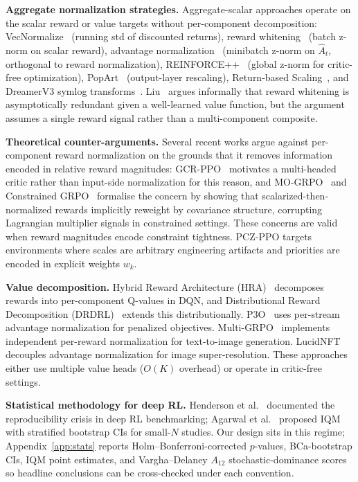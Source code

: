 \documentclass[11pt,a4paper]{article}
\begin{document}
\textbf{Aggregate normalization strategies.} Aggregate-scalar approaches operate on the scalar reward or value targets without per-component decomposition: VecNormalize~\cite{raffin2021sb3} (running std of discounted returns), reward whitening~\cite{liu2023rewardwhitening,huang2024rlhf} (batch z-norm on scalar reward), advantage normalization~\cite{andrychowicz2021whatmatters,huang2022thirtysevendetails} (minibatch z-norm on $\hat{A}_t$, orthogonal to reward normalization), REINFORCE++~\cite{hu2025reinforceplusplus} (global z-norm for critic-free optimization), PopArt~\cite{hessel2019popart,hasselt2016popart} (output-layer rescaling), Return-based Scaling~\cite{schaul2021returnscaling}, and DreamerV3 symlog transforms~\cite{sullivan2023dreamerv3tricks}. Liu~\cite{liu2023rewardwhitening} argues informally that reward whitening is asymptotically redundant given a well-learned value function, but the argument assumes a single reward signal rather than a multi-component composite.

\textbf{Theoretical counter-arguments.}
Several recent works argue against per-component reward normalization on the grounds that it removes information encoded in relative reward magnitudes: GCR-PPO~\cite{gcrppo2025} motivates a multi-headed critic rather than input-side normalization for this reason, and MO-GRPO~\cite{mogrpo2024} and Constrained GRPO~\cite{girgis2026constrainedgrpo} formalise the concern by showing that scalarized-then-normalized rewards implicitly reweight by covariance structure, corrupting Lagrangian multiplier signals in constrained settings. These concerns are valid when reward magnitudes encode constraint tightness. PCZ-PPO targets environments where scales are arbitrary engineering artifacts and priorities are encoded in explicit weights $w_k$.

\textbf{Value decomposition.}
Hybrid Reward Architecture (HRA)~\cite{vanseijen2017hra} decomposes rewards into per-component Q-values in DQN, and Distributional Reward Decomposition (DRDRL)~\cite{lin2019drdrl} extends this distributionally. P3O~\cite{zhang2022p3o} uses per-stream advantage normalization for penalized objectives. Multi-GRPO~\cite{lyu2025multigrpo} implements independent per-reward normalization for text-to-image generation. LucidNFT~\cite{lucidnft2026} decouples advantage normalization for image super-resolution. These approaches either use multiple value heads ($O(K)$ overhead) or operate in critic-free settings.

\textbf{Statistical methodology for deep RL.}
Henderson et al.~\cite{henderson2018deeprl} documented the reproducibility crisis in deep RL benchmarking; Agarwal et al.~\cite{agarwal2021rliable} proposed IQM with stratified bootstrap CIs for small-$N$ studies. Our design sits in this regime; Appendix~\ref{app:stats} reports Holm--Bonferroni-corrected $p$-values, BCa-bootstrap CIs, IQM point estimates, and Vargha--Delaney $A_{12}$ stochastic-dominance scores so headline conclusions can be cross-checked under each convention.
\end{document}
